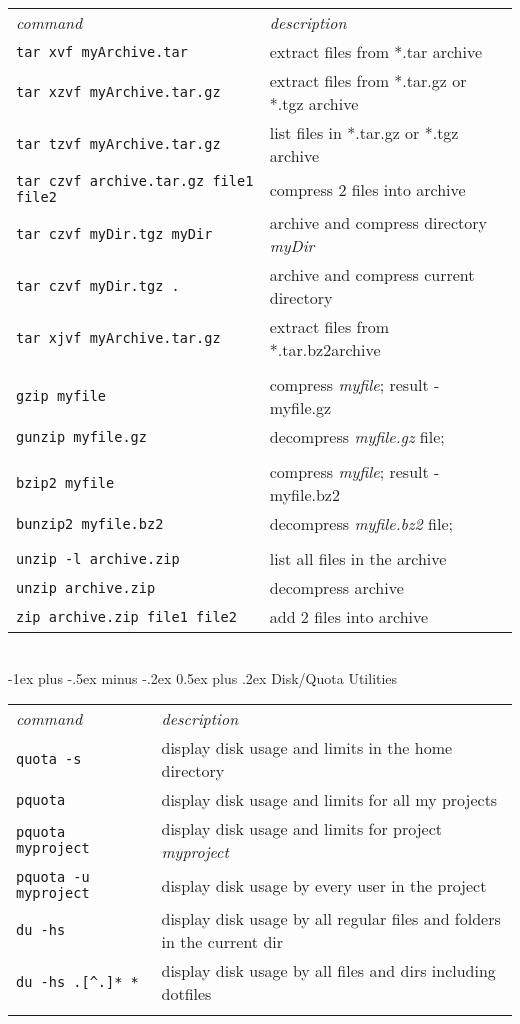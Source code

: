 \documentclass[10pt,landscape]{article}
\makeatletter
\renewcommand{\section}{\@startsection{section}{1}{0mm}%
                                {-1ex plus -.5ex minus -.2ex}%
                                {0.5ex plus .2ex}%
                                {\normalfont\large\bfseries}}
\makeatother
\begin{document}
\begin{multicols}{2}
\begin{tabular}{ll}
\emph{command} & \emph{description} \\
\texttt{tar xvf myArchive.tar} & extract files from *.tar archive\\
\texttt{tar xzvf myArchive.tar.gz} & extract files from *.tar.gz or *.tgz archive\\
\texttt{tar tzvf myArchive.tar.gz} & list files in *.tar.gz or *.tgz archive\\
\texttt{tar czvf archive.tar.gz file1 file2} & compress 2 files into archive\\
\texttt{tar czvf myDir.tgz myDir} & archive and compress directory \textit{myDir} \\
\texttt{tar czvf myDir.tgz .} & archive and compress current directory \\
\texttt{tar xjvf myArchive.tar.gz} & extract files from *.tar.bz2archive\\
\\
\texttt{gzip myfile} & compress \textit{myfile}; result - myfile.gz \\
\texttt{gunzip myfile.gz} & decompress \textit{myfile.gz} file;  \\
\\
\texttt{bzip2 myfile} & compress \textit{myfile}; result - myfile.bz2 \\
\texttt{bunzip2 myfile.bz2} & decompress \textit{myfile.bz2} file;  \\
\\
\texttt{unzip -l archive.zip} & list all files in the archive \\
\texttt{unzip archive.zip} & decompress archive \\
\texttt{zip archive.zip file1 file2} & add 2 files into archive \\
\end{tabular}
\\

\section{Disk/Quota Utilities}
\begin{tabular}{ll}

\emph{command} & \emph{description} \\
\texttt{quota -s} & display disk usage and limits in the home directory\\
\texttt{pquota} & display disk usage and limits for all my projects\\
\texttt{pquota myproject} & display disk usage and limits for project \textit{myproject}\\
\texttt{pquota -u myproject} & display disk usage by every user in the project\\
\texttt{du -hs} & display disk usage by all regular files and folders in the current dir\\
\texttt{du -hs  .[\^{}.]* *} & display disk usage by all files and dirs including dotfiles\\
\\
\end{tabular}


\end{multicols}
\end{document}
